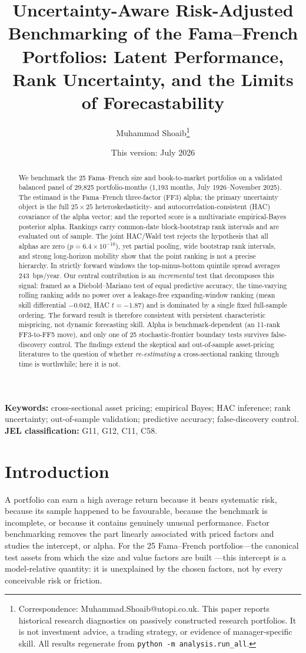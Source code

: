 \documentclass[11pt]{article}
\title{\bfseries Uncertainty-Aware Risk-Adjusted Benchmarking of the
Fama--French Portfolios: Latent Performance, Rank Uncertainty, and the
Limits of Forecastability}
\author{Muhammad Shoaib\thanks{Correspondence: Muhammad.Shoaib@utopi.co.uk.
This paper reports historical research diagnostics on passively constructed
research portfolios. It is not investment advice, a trading strategy, or
evidence of manager-specific skill. All results regenerate from
\texttt{python -m analysis.run\_all}.}}
\date{This version: July 2026}
\begin{document}
\maketitle

\begin{abstract}
\noindent
We benchmark the 25 Fama--French size and book-to-market portfolios on a
validated balanced panel of 29,825 portfolio-months (1,193 months, July
1926--November 2025). The estimand is the Fama--French three-factor (FF3)
alpha; the primary uncertainty object is the full $25\times25$
heteroskedasticity- and autocorrelation-consistent (HAC) covariance of the
alpha vector; and the reported score is a multivariate empirical-Bayes
posterior alpha. Rankings carry common-date block-bootstrap rank intervals and
are evaluated out of sample. The joint HAC/Wald test rejects the hypothesis
that all alphas are zero ($p=6.4\times10^{-10}$), yet partial pooling, wide
bootstrap rank intervals, and strong long-horizon mobility show that the point
ranking is not a precise hierarchy. In strictly forward windows the
top-minus-bottom quintile spread averages 243~bps/year. Our central
contribution is an \emph{incremental} test that decomposes this signal: framed
as a Diebold--Mariano test of equal predictive accuracy, the time-varying
rolling ranking adds no power over a leakage-free expanding-window ranking
(mean skill differential $-0.042$, HAC $t=-1.87$) and is dominated by a single
fixed full-sample ordering. The forward result is therefore consistent with
persistent characteristic mispricing, not dynamic forecasting skill. Alpha is
benchmark-dependent (an 11-rank FF3-to-FF5 move), and only one of 25
stochastic-frontier boundary tests survives false-discovery control. The
findings extend the skeptical and out-of-sample asset-pricing literatures to
the question of whether \emph{re-estimating} a cross-sectional ranking through
time is worthwhile; here it is not.
\end{abstract}

\noindent\textbf{Keywords:} cross-sectional asset pricing; empirical Bayes;
HAC inference; rank uncertainty; out-of-sample validation; predictive
accuracy; false-discovery control.\\
\textbf{JEL classification:} G11, G12, C11, C58.

\section{Introduction}
A portfolio can earn a high average return because it bears systematic risk,
because its sample happened to be favourable, because the benchmark is
incomplete, or because it contains genuinely unusual performance. Factor
benchmarking removes the part linearly associated with priced factors and
studies the intercept, or alpha. For the 25 Fama--French portfolios---the
canonical test assets from which the size and value factors are built
\citep{FamaFrench1993}---this intercept is a model-relative quantity: it is
unexplained by the chosen factors, not by every conceivable risk or friction.
\end{document}
